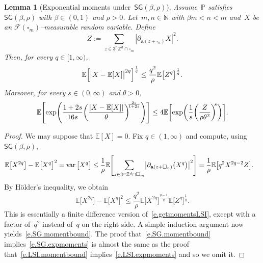 \documentclass[11pt]{article} %
\let\oldsquare\square %
\renewcommand{\square}{\oldsquare}
\numberwithin{equation}{section}
\newtheorem{lemma}[theorem]{Lemma}
\theoremstyle{definition}
\let\originalleft\left
\let\originalright\right
\renewcommand{\left}{\mathopen{}\mathclose\bgroup\originalleft}
\renewcommand{\right}{\aftergroup\egroup\originalright}
\newcommand*{\N}{\ensuremath{\mathbb{N}}}
\newcommand*{\Zd}{\ensuremath{\mathbb{Z}^d}}
\renewcommand{\a}{\mathbf{a}}
\newcommand{\cu}{\square}
\newcommand{\F}{\mathcal{F}}
\renewcommand{\P}{\mathbb{P}}
\newcommand{\E}{\mathbb{E}}
\DeclareMathOperator{\var}{var}
\newcommand{\SG}{\mathsf{SG}}
\begin{document}
\begin{lemma}[Exponential moments under~$\SG(\beta,\rho)$] 
\label{l.SG.moments}
Assume~$\P$ satisfies~$\SG(\beta,\rho)$ with $\beta \in (0,1)$ and $\rho>0$. Let~$m,n\in\N$ with $\beta m < n < m$  and~$X$ be an $\F(\cu_m)$--measurable random variable. Define
\begin{equation}
\label{e.Zderv.again.2}
Z := \sum_{z\in3^n\Zd\cap \cu_m} |  \partial_{\a(z+\cu_n)} X|^2.
\end{equation}
Then, for every $q\in [1,\infty)$, 
\begin{align}
\label{e.SG.momentbound}
\E \left[ \big| X - \E[X] \big|^{2q} \right]^{\frac1{q}}
\leq 
\frac{q^2}{\rho} \E \big[ Z^{q} \big]^{\frac1{q}}.
\end{align}
Moreover, for every $s\in (0,\infty)$ and $\theta>0$, 
\begin{align}
\label{e.SG.expmoments}
\E \left[ \exp\Biggl( \frac{1+2s}{16s}\biggl( \frac{ \left| X - \E[X] \right|}{\theta} \biggr)^{\!\!\frac{2s}{1+2s}} \Biggr) \right]
\leq 
4 \E \left[ \exp\biggl( \frac1{s} \left( \frac{Z}{\rho\theta^2}  \biggr)^{\!\!s} \right) \right].
\end{align}
\end{lemma}
\begin{proof}
We may suppose that $\E[X]=0$. 
Fix $q\in (1,\infty)$ and compute, using $\SG(\beta,\rho)$, 
\begin{align*}
\E \big[ X^{2q} \big] - \E \big[ X^{q} \big]^2 
=
\var\big[ X^q \big]
& 
\leq
\frac1\rho 
\E \Biggl[
\sum_{z\in 3^n\Zd \cap \cu_m}
\left| \partial_{\a(z+\cu_n)} \bigl( X^q \bigr)
\right|^2
\Biggr]
=
\frac1\rho \E \left[ q^2 X^{2q-2} Z \right].
\end{align*}
By H\"older's inequality, we obtain
\begin{equation*}
\E \big[ X^{2q} \big] - \E \big[ X^{q} \big]^2 
\leq
\frac{q^2} \rho 
\E \big[ X^{2q} \big]^{\frac{q-1}{q}} \E \big[ Z^{q} \big]^{\frac1q}.
\end{equation*}
This is essentially a finite difference version of~\eqref{e.getmomentsLSI}, except with a factor of~$q^2$ instead of~$q$ on the right side. A simple induction argument now yields~\eqref{e.SG.momentbound}. 
The proof that~\eqref{e.SG.momentbound} implies~\eqref{e.SG.expmoments} is almost the same as the proof that~\eqref{e.LSI.momentbound} implies~\eqref{e.LSI.expmoments} and so we omit it.
\end{proof}
\end{document}
